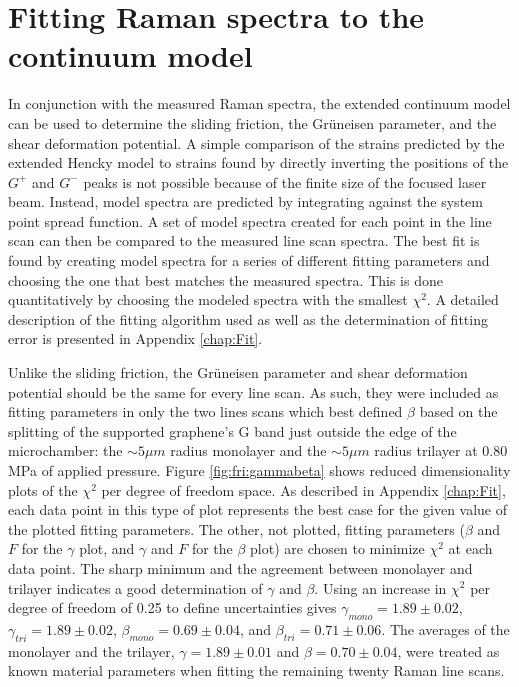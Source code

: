 \section{Fitting Raman spectra to the continuum model}
In conjunction with the measured Raman spectra, the extended continuum model can be used to determine the sliding friction, the Gr\"{u}neisen parameter, and the shear deformation potential.
A simple comparison of the strains predicted by the extended Hencky model to strains found by directly inverting the positions of the $G^+$ and $G^-$ peaks is not possible because of the finite size of the focused laser beam.
Instead, model spectra are predicted by integrating against the system point spread function.
A set of model spectra created for each point in the line scan can then be compared to the measured line scan spectra.
The best fit is found by creating model spectra for a series of different fitting parameters and choosing the one that best matches the measured spectra.
This is done quantitatively by choosing the modeled spectra with the smallest $\chi^2$.
A detailed description of the fitting algorithm used as well as the determination of fitting error is presented in Appendix \ref{chap:Fit}.

Unlike the sliding friction, the Gr\"{u}neisen parameter and shear deformation potential should be the same for every line scan.
As such, they were included as fitting parameters in only the two lines scans which best defined $\beta$ based on the splitting of the supported graphene's G band just outside the edge of the microchamber: the $\sim 5 \mu m$ radius monolayer and the $\sim 5 \mu m$ radius trilayer at 0.80 MPa of applied pressure.
Figure \ref{fig:fri:gammabeta} shows reduced dimensionality plots of the $\chi^2$ per degree of freedom space.
As described in Appendix \ref{chap:Fit}, each data point in this type of plot represents the best case for the given value of the plotted fitting parameters.
The other, not plotted, fitting parameters ($\beta$ and $F$ for the $\gamma$ plot, and $\gamma$ and $F$ for the $\beta$ plot) are chosen to minimize $\chi^2$ at each data point.
The sharp minimum and the agreement between monolayer and trilayer indicates a good determination of $\gamma$ and $\beta$.
Using an increase in $\chi^2$ per degree of freedom of 0.25 to define uncertainties gives $\gamma_{mono} = 1.89 \pm 0.02$, $\gamma_{tri} = 1.89 \pm 0.02$, $\beta_{mono} = 0.69 \pm 0.04$, and $\beta_{tri} = 0.71 \pm 0.06$.
The averages of the monolayer and the trilayer, $\gamma=1.89 \pm 0.01$ and $\beta= 0.70 \pm 0.04$, were treated as known material parameters when fitting the remaining twenty Raman line scans.

